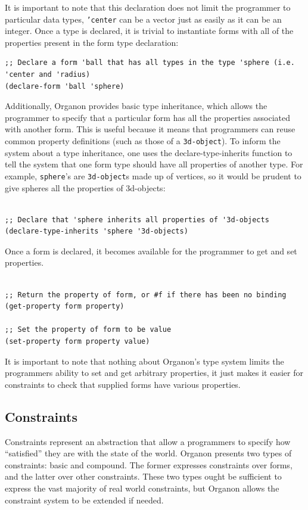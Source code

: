 \documentclass[12pt,a4paper]{article}
\begin{document}
It is important to note that this declaration does not limit the programmer to particular data types, \texttt{'center} can be a vector just as easily as it can be an integer.  Once a type is declared, it is trivial to instantiate forms with all of the properties present in the form type declaration:
\begin{lstlisting}
;; Declare a form 'ball that has all types in the type 'sphere (i.e. 'center and 'radius)
(declare-form 'ball 'sphere) 
\end{lstlisting}

Additionally, Organon provides basic type inheritance, which allows the programmer to specify that a particular form has all the properties associated with another form.   This is useful because it means that programmers can reuse common property definitions (such as those of a \texttt{3d-object}).  To inform the system about a type inheritance, one uses the declare-type-inherits function to tell the system that one form type should have all properties of another type.  For example, \texttt{sphere}'s are \texttt{3d-object}s made up of vertices, so it would be prudent to give spheres all the properties of 3d-objects:
\begin{lstlisting}

;; Declare that 'sphere inherits all properties of '3d-objects
(declare-type-inherits 'sphere '3d-objects)
\end{lstlisting}

Once a form is declared, it becomes available for the programmer to get and set properties.
\begin{lstlisting}

;; Return the property of form, or #f if there has been no binding
(get-property form property)

;; Set the property of form to be value 
(set-property form property value)
\end{lstlisting}

It is important to note that nothing about Organon's type system limits the programmers ability to set and get arbitrary properties, it just makes it easier for constraints to check that supplied forms have various properties. 

\subsection{Constraints}
Constraints represent an abstraction that allow a programmers to specify how ``satisfied'' they are with the state of the world.  Organon presents two types of constraints: basic and compound.  The former expresses constraints over forms, and the latter over other constraints.  These two types ought be sufficient to express the vast majority of real world constraints, but Organon allows the constraint system to be extended if needed.
\end{document}
